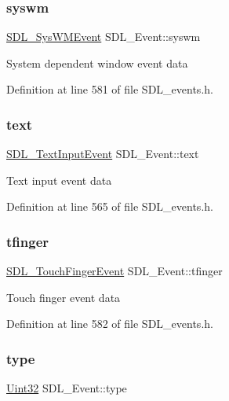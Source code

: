 \subsubsection{\texorpdfstring{syswm}{syswm}}
{\footnotesize\ttfamily \mbox{\hyperlink{struct_s_d_l___sys_w_m_event}{S\+D\+L\+\_\+\+Sys\+W\+M\+Event}} S\+D\+L\+\_\+\+Event\+::syswm}

System dependent window event data 

Definition at line 581 of file S\+D\+L\+\_\+events.\+h.

\mbox{\label{union_s_d_l___event_aa4fc65c559d69f33c057c0c23d8414b8}} 
\subsubsection{\texorpdfstring{text}{text}}
{\footnotesize\ttfamily \mbox{\hyperlink{struct_s_d_l___text_input_event}{S\+D\+L\+\_\+\+Text\+Input\+Event}} S\+D\+L\+\_\+\+Event\+::text}

Text input event data 

Definition at line 565 of file S\+D\+L\+\_\+events.\+h.

\mbox{\label{union_s_d_l___event_ab18d7d60794cb056948ffa58541bc3c5}} 
\subsubsection{\texorpdfstring{tfinger}{tfinger}}
{\footnotesize\ttfamily \mbox{\hyperlink{struct_s_d_l___touch_finger_event}{S\+D\+L\+\_\+\+Touch\+Finger\+Event}} S\+D\+L\+\_\+\+Event\+::tfinger}

Touch finger event data 

Definition at line 582 of file S\+D\+L\+\_\+events.\+h.

\mbox{\label{union_s_d_l___event_a237648bec242d2d5835f1a4250ddfa46}} 
\subsubsection{\texorpdfstring{type}{type}}
{\footnotesize\ttfamily \mbox{\hyperlink{_s_d_l__stdinc_8h_add440eff171ea5f55cb00c4a9ab8672d}{Uint32}} S\+D\+L\+\_\+\+Event\+::type}

